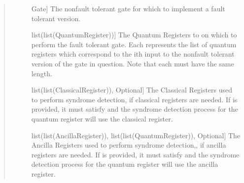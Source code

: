 \documentclass[letterpaper,10pt,english]{sphinxmanual}
\begin{document}
\begin{fulllineitems}
\begin{fulllineitems}
\begin{quote}
\begin{description}
\begin{description}
\item[{}] \leavevmode{[}Gate{]}
The non\sphinxhyphen{}fault tolerant gate for which to implement a fault tolerant version.

\item[{}] \leavevmode{[}list(list(QuantumRegister)){]}
The Quantum Registers to on which to perform the fault tolerant gate. Each  represents the list of quantum registers which correspond to the ith input to the non\sphinxhyphen{}fault tolerant version of the gate in question. Note that each  must have the same length.

\item[{}] \leavevmode{[}list(list(ClassicalRegister)), Optional{]}
The Classical Registers used to perform syndrome detection, if classical registers are needed. If  is provided, it must satisfy  and the syndrome detection process for the  quantum register will use the  classical register.

\item[{}] \leavevmode{[}list(list(AncillaRegister)), list(list(QuantumRegister)), Optional{]}
The Ancilla Registers used to perform syndrome detection,, if ancilla registers are needed. If  is provided, it must satisfy  and the syndrome detection process for the  quantum register will use the  ancilla register.

\end{description}

\end{description}\end{quote}

\end{fulllineitems}


\end{fulllineitems}

\end{document}
